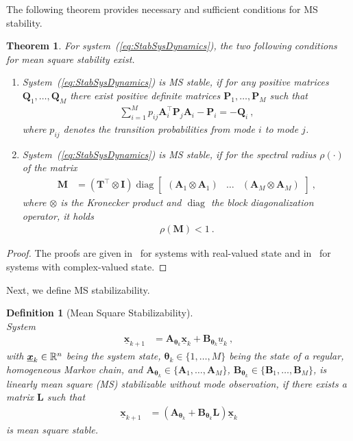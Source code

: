 \documentclass[preprint,1p,11pt]{IR-Template/ISAS_IR}
\newcommand{\rv}[1]{\ensuremath{{\boldsymbol{#1}}}}
\newcommand{\nvec}[1]{\ensuremath{{{\underline{#1}}}}}
\newcommand{\rvec}[1]{\ensuremath{{\boldsymbol{\underline{#1}}}}}
\newcommand{\mat}[1]{{\ensuremath{{\mathbf{#1}}}}}
\newcommand{\tr}{^{\top}}
\newcommand{\identitymatrix}{\mat{I}}
\newcommand{\klammer}[1]{\left( #1 \right)}
\newcommand{\kron}[2]{{#1 \otimes #2}}
\DeclareMathOperator{\diag}{diag}
\newcommand{\Asys}[1]{\mat{A}_{#1}}
\newcommand{\Bsys}[1]{\mat{B}_{#1}}
\newcommand{\Qsys}[1]{\mat{Q}_{#1}}
\newcommand{\xsys}[1]{\rvec{x}_{#1}}
\newcommand{\usys}[1]{\nvec{u}_{#1}}
\newcommand{\mode}[1]{\rv{\theta}_{#1}}
\newcommand{\spectralradius}[1]{\rho\klammer{#1}}
\newcommand{\bigM}{\mat{M}}
\newcommand{\TransitionMatrix}[1]{\mat{T}_{#1}}
\newcommand{\transitionprob}[1]{p_{#1}}
\newcommand{\ControlLaw}{\mat{L}}
\newcommand{\NumModes}{M}
\renewcommand{\P}[1]{\mat{P}_{#1}}
\newtheorem{theorem}{Theorem}
\newtheorem{definition}{Definition}
\newtheorem{proof}{Proof}
\begin{document}
The following theorem provides necessary and sufficient conditions for MS stability.
\begin{theorem}
For system~(\ref{eq:StabSysDynamics}), the two following conditions for mean square stability exist.
\begin{enumerate}[label = \alph*)]
\item 
	System~(\ref{eq:StabSysDynamics}) is MS stable, if for any positive matrices $\Qsys{1},\dots,\Qsys{\NumModes}$ there exist positive definite matrices $\P{1},\dots,\P{\NumModes}$ such that
\begin{align*}
	\sum\limits_{i=1}^{\NumModes} \transitionprob{ij} \Asys{i}\tr\P{j}\Asys{i} - \P{i} = -\Qsys{i}\ ,
	\end{align*}
where $\transitionprob{ij}$ denotes the transition probabilities from mode $i$ to mode $j$.
\item
	System~(\ref{eq:StabSysDynamics}) is MS stable, if for the spectral radius $\spectralradius{\cdot}$ of the matrix
\begin{align}
		\bigM
			&=
			\klammer{\kron{\TransitionMatrix{}\tr}{\identitymatrix}} \diag\begin{bmatrix}(\kron{\Asys{1}}{\Asys{1}}) & \dots & (\kron{\Asys{\NumModes}}{\Asys{\NumModes}})\end{bmatrix}\ ,
	\label{eq:AugmentedMatrix}
	\end{align}
where $\kron{}{}$ is the Kronecker product and $\diag$ the block diagonalization operator, it holds
\begin{align*}
		\spectralradius{\bigM} < 1\ .
	\end{align*}
\end{enumerate}
\label{theor:MSS}
\end{theorem}
\begin{proof}
The proofs are given in~\cite{Morozan_1983,Fang_2002,Ling_2012} for systems with real-valued state and in~\cite{Costa_1993} for systems with complex-valued state.
\end{proof}

Next, we define MS stabilizability.
\begin{definition}[Mean Square Stabilizability]\hfill\\
System
\begin{align*}
\xsys{k+1}
	&=
	\Asys{\mode{k}}\xsys{k} + \Bsys{\mode{k}}\usys{k}\ ,
\end{align*}
with $\xsys{k}\in\IR^n$ being the system state, $\mode{k}\in\{1,\dots,\NumModes\}$ being the state of a regular, homogeneous Markov chain, and $\Asys{\mode{k}}\in\{\Asys{1},\dots,\Asys{\NumModes}\}$, $\Bsys{\mode{k}}\in\{\Bsys{1},\dots,\Bsys{\NumModes}\}$, is linearly mean square (MS) stabilizable without mode observation, if there exists a matrix $\ControlLaw$ such that
\begin{align*}
\xsys{k+1}
	&=
	\klammer{\Asys{\mode{k}}+\Bsys{\mode{k}}\ControlLaw}\xsys{k}
\end{align*}
is mean square stable.
\label{def:MSStab}
\end{definition}
    	
\end{document}
